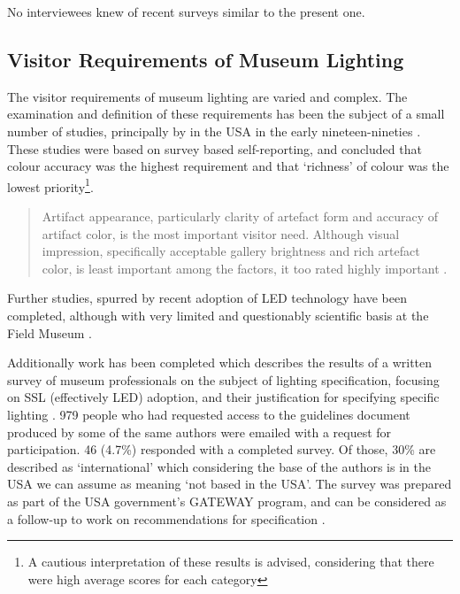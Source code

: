 No interviewees knew of recent surveys similar to the present one.

\subsection{Visitor Requirements of Museum Lighting}

The visitor requirements of museum lighting are varied and complex. The examination and definition of these requirements has been the subject of a small number of studies, principally by \citet{kesner_museum_1993-1} in the USA in the early nineteen-nineties \citep{kesner_museum_1993,kesner_exhibition_1992,kesner_current_1991,kesner_analysis_1997}. These studies were based on survey based self-reporting, and concluded that colour accuracy was the highest requirement and that `richness' of colour was the lowest priority\footnote{A cautious interpretation of these results is advised, considering that there were high average scores for each category}.

\begin{quote}
Artifact appearance, particularly clarity of artefact form and accuracy of artifact color, is the most important visitor need. Although visual impression, specifically acceptable gallery brightness and rich artefact color, is least important among the factors, it too rated highly important \citep{kesner_museum_1993-1}.
\end{quote}

Further studies, spurred by recent adoption of \gls{LED} technology have been completed, although with very limited and questionably scientific basis at the Field Museum \citep{myer_demonstration_2010}.

Additionally work has been completed which describes the results of a written survey of museum professionals on the subject of lighting specification, focusing on SSL (effectively \gls{LED}) adoption, and their justification for specifying specific lighting \citep{perrin_ssl_2014}. 979 people who had requested access to the guidelines document produced by some of the same authors \citep{druzik_guidelines_2012} were emailed with a request for participation. 46 (4.7\%) responded with a completed survey. Of those, 30\% are described as `international' which considering the base of the authors is in the USA we can assume as meaning `not based in the USA'. The survey was prepared as part of the USA government's GATEWAY program, and can be considered as a follow-up to work on recommendations for specification \citep{druzik_guidelines_2012}. 

